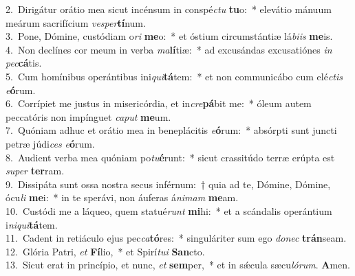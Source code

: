 {2.~}Dirigátur orátio mea sicut incénsum in conspé\textit{ctu} \textbf{tu}o:~* elevátio mánuum meárum sacrifícium \textit{ve}\textit{sper}\textbf{tí}num.\\
{3.~}Pone, Dómine, custódiam o\textit{ri} \textbf{me}o:~* et óstium circumstántiæ lá\textit{bi}\textit{is} \textbf{me}is.\\
{4.~}Non declínes cor meum in verba \textit{ma}\textbf{lí}tiæ:~* ad excusándas excusatiónes \textit{in} \textit{pec}\textbf{cá}tis.\\
{5.~}Cum homínibus operántibus ini\textit{qui}\textbf{tá}tem:~* et non communicábo cum elé\textit{ctis} \textit{e}\textbf{ó}rum.\\
{6.~}Corrípiet me justus in misericórdia, et in\textit{cre}\textbf{pá}bit me:~* óleum autem peccatóris non impínguet \textit{ca}\textit{put} \textbf{me}um.\\
{7.~}Quóniam adhuc et orátio mea in beneplácitis \textit{e}\textbf{ó}rum:~* absórpti sunt juncti petræ júdi\textit{ces} \textit{e}\textbf{ó}rum.\\
{8.~}Audient verba mea quóniam po\textit{tu}\textbf{é}runt:~* sicut crassitúdo terræ erúpta est \textit{su}\textit{per} \textbf{ter}ram.\\
{9.~}Dissipáta sunt ossa nostra secus inférnum:~† quia ad te, Dómine, Dómine, ócu\textit{li} \textbf{me}i:~* in te sperávi, non áuferas á\textit{ni}\textit{mam} \textbf{me}am.\\
{10.~}Custódi me a láqueo, quem statué\textit{runt} \textbf{mi}hi:~* et a scándalis operántium i\textit{ni}\textit{qui}\textbf{tá}tem.\\
{11.~}Cadent in retiáculo ejus pec\textit{ca}\textbf{tó}res:~* singuláriter sum ego \textit{do}\textit{nec} \textbf{trán}seam.\\
{12.~}Glória Patri, \textit{et} \textbf{Fí}lio,~* et Spirí\textit{tu}\textit{i} \textbf{San}cto.\\
{13.~}Sicut erat in princípio, et nunc, \textit{et} \textbf{sem}per,~* et in sǽcula sæcu\textit{ló}\textit{rum}. \textbf{A}men.\\

